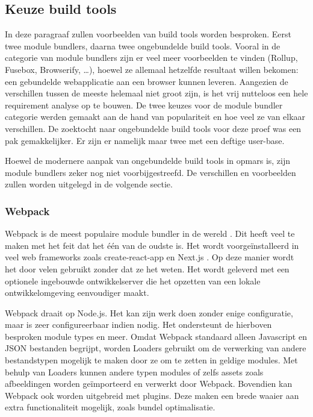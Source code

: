 \subsection{Keuze build tools}

In deze paragraaf zullen voorbeelden van build tools worden besproken. Eerst twee module bundlers, daarna twee ongebundelde build tools. Vooral in de categorie van module bundlers zijn er veel meer voorbeelden te vinden (Rollup, Fusebox, Browserify, …), hoewel ze allemaal hetzelfde resultaat willen bekomen: een gebundelde webapplicatie aan een browser kunnen leveren. Aangezien de verschillen tussen de meeste helemaal niet groot zijn, is het vrij nutteloos een hele requirement analyse op te bouwen. De twee keuzes voor de module bundler categorie werden gemaakt aan de hand van populariteit en hoe veel ze van elkaar verschillen. De zoektocht naar ongebundelde build tools voor deze proef was een pak gemakkelijker. Er zijn er namelijk maar twee met een deftige user-base. 

Hoewel de modernere aanpak van ongebundelde build tools in opmars is, zijn module bundlers zeker nog niet voorbijgestreefd. De verschillen en voorbeelden zullen worden uitgelegd in de volgende sectie. 

\subsubsection{Webpack}

Webpack is de meest populaire module bundler in de wereld \autocite{}. Dit heeft veel te maken met het feit dat het één van de oudste is. Het wordt voorgeïnstalleerd in veel \gls{web frameworks} zoals create-react-app en Next.js \autocite{}. Op deze manier wordt het door velen gebruikt zonder dat ze het weten. Het wordt geleverd met een optionele ingebouwde ontwikkelserver die het opzetten van een lokale ontwikkelomgeving eenvoudiger maakt.

Webpack draait op Node.js. Het kan zijn werk doen zonder enige configuratie, maar is zeer configureerbaar indien nodig. Het ondersteunt de hierboven besproken module types en meer. Omdat Webpack standaard alleen Javascript en JSON bestanden begrijpt, worden Loaders gebruikt om de verwerking van andere bestandstypen mogelijk te maken door ze om te zetten in geldige modules. Met behulp van Loaders kunnen andere typen modules of zelfs assets zoals afbeeldingen worden geïmporteerd en verwerkt door Webpack. Bovendien kan Webpack ook worden uitgebreid met plugins. Deze maken een brede waaier aan extra functionaliteit mogelijk, zoals bundel optimalisatie. 

